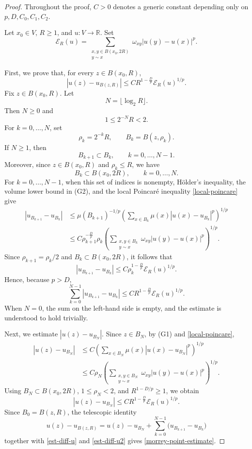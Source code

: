 \documentclass[twoside,12pt,letter]{article}
\theoremstyle{plain}
\theoremstyle{definition}
\theoremstyle{remark}
\numberwithin{equation}{section}
\begin{document}
\begin{proof}
Throughout the proof, \(C>0\) denotes a generic constant depending only on
\(p,D,C_0,C_1,C_2\).

Let \(x_0\in V\), \(R\ge 1\), and \(u:V\to\mathbb{R}\). Set
\[
\mathcal{E}_R(u)
=
\sum_{\substack{x,y\in B(x_0,2R)\\ y\sim x}}
\omega_{xy}|u(y)-u(x)|^p.
\]

First, we prove that, for every \(z\in B(x_0,R)\),
\begin{equation}\label{morrey-point-estimate}
|u(z)-u_{B(z,R)}|
\le
C R^{1-\frac{D}{p}}\mathcal{E}_R(u)^{1/p}.
\end{equation}
Fix \(z\in B(x_0,R)\). Let
\[
N=\lfloor \log_2 R\rfloor.
\]
Then \(N\ge 0\) and
\[
1\le 2^{-N}R<2.
\]
For \(k=0,\ldots,N\), set
\[
\rho_k=2^{-k}R,
\qquad
B_k=B(z,\rho_k).
\]
If \(N\ge 1\), then
\[
B_{k+1}\subset B_k,\qquad k=0,\ldots,N-1.
\]
Moreover, since \(z\in B(x_0,R)\) and \(\rho_k\le R\), we have
\[
B_k\subset B(x_0,2R),
\qquad k=0,\ldots,N.
\]
For \(k=0,\ldots,N-1\), when this set of indices is nonempty, H\"older's
inequality, the volume lower bound in {\rm(G2)}, and the local Poincar\'e
inequality \eqref{local-poincare} give
\[
\begin{aligned}
|u_{B_{k+1}}-u_{B_k}|
&\le
\mu(B_{k+1})^{-1/p}
\left(
\sum_{x\in B_k}\mu(x)|u(x)-u_{B_k}|^p
\right)^{1/p}  \\
&\le
C\rho_{k+1}^{-\frac{D}{p}}\rho_k
\left(
\sum_{\substack{x,y\in B_k\\ y\sim x}}
\omega_{xy}|u(y)-u(x)|^p
\right)^{1/p}.
\end{aligned}
\]
Since \(\rho_{k+1}=\rho_k/2\) and \(B_k\subset B(x_0,2R)\), it follows that
\[
|u_{B_{k+1}}-u_{B_k}|
\le
C\rho_k^{1-\frac{D}{p}}\mathcal{E}_R(u)^{1/p}.
\]
Hence, because \(p>D\),
\begin{equation}\label{est-diff-u}
\sum_{k=0}^{N-1}|u_{B_{k+1}}-u_{B_k}|
\le
C R^{1-\frac{D}{p}}\mathcal{E}_R(u)^{1/p}.
\end{equation}
When \(N=0\), the sum on the left-hand side is empty, and the estimate is
understood to hold trivially.

Next, we estimate \(|u(z)-u_{B_N}|\). Since \(z\in B_N\), by {\rm(G1)} and
\eqref{local-poincare},
\[
\begin{aligned}
|u(z)-u_{B_N}|
&\le
C
\left(
\sum_{x\in B_N}\mu(x)|u(x)-u_{B_N}|^p
\right)^{1/p}  \\
&\le
C\rho_N
\left(
\sum_{\substack{x,y\in B_N\\ y\sim x}}
\omega_{xy}|u(y)-u(x)|^p
\right)^{1/p}.
\end{aligned}
\]
Using \(B_N\subset B(x_0,2R)\), \(1\le \rho_N<2\), and
\(R^{1-D/p}\ge 1\), we obtain
\begin{equation}\label{est-diff-u2}
|u(z)-u_{B_N}|
\le
C R^{1-\frac{D}{p}}\mathcal{E}_R(u)^{1/p}.
\end{equation}
Since \(B_0=B(z,R)\), the telescopic identity
\[
u(z)-u_{B(z,R)}
=
u(z)-u_{B_N}
+
\sum_{k=0}^{N-1}\bigl(u_{B_{k+1}}-u_{B_k}\bigr)
\]
together with \eqref{est-diff-u} and \eqref{est-diff-u2} gives
\eqref{morrey-point-estimate}.


\end{proof}
\end{document}
